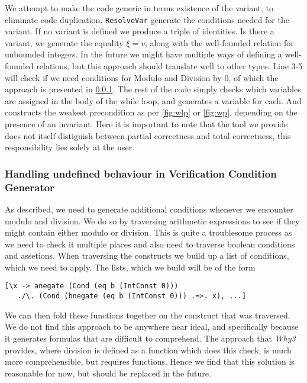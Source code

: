 We attempt to make the code generic in terms existence of the variant, to eliminate code duplication.
\texttt{ResolveVar} generate the conditions needed for the variant.
If no variant is defined we produce a triple of identities.
Is there a variant, we generate the equality $\xi = v$, along with the well-founded relation for unbounded integers.
In the future we might have multiple ways of defining a well-founded relations, but this approach should translate well to other types.
Line 3-5 will check if we need conditions for Modulo and Division by 0, of which the approach is presented in \cref{sec:undef}. The rest of the code simply checks which variables are assigned in the body of the while loop, and generates a variable for each. And constructs the weakest precondition as per \cref{fig:wlp} or \cref{fig:wp}, depending on the presence of an invariant. Here it is important to note that the tool we provide does not itself distiguish between partial correctness and total correctness, this responsibility lies solely at the user.

\subsubsection{Handling undefined behaviour in Verification Condition Generator}\label{sec:undef}
As described, we need to generate additional conditions whenever we encounter modulo and division. We do so by traversing arithmetic expressions to see if they might contain either modulo or division. This is quite a troublesome process as we need to check it multiple places and also need to traverse boolean conditions and assetions. When traversing the constructs we build up a list of conditions, which we need to apply. The lists, which we build will be of the form
\begin{verbatim}
[\x -> anegate (Cond (eq b (IntConst 0)))
   ./\. (Cond (bnegate (eq b (IntConst 0))) .=>. x), ...]
\end{verbatim}
We can then fold these functions together on the construct that was traversed.
We do not find this approach to be anywhere near ideal, and specifically because it generates formulas that are difficult to comprehend.
The approach that \textit{Why3} provides, where division is defined as a function which does this check, is much more comprehensible, but requires functions. Hence we find that this solution is reasonable for now, but should be replaced in the future.
